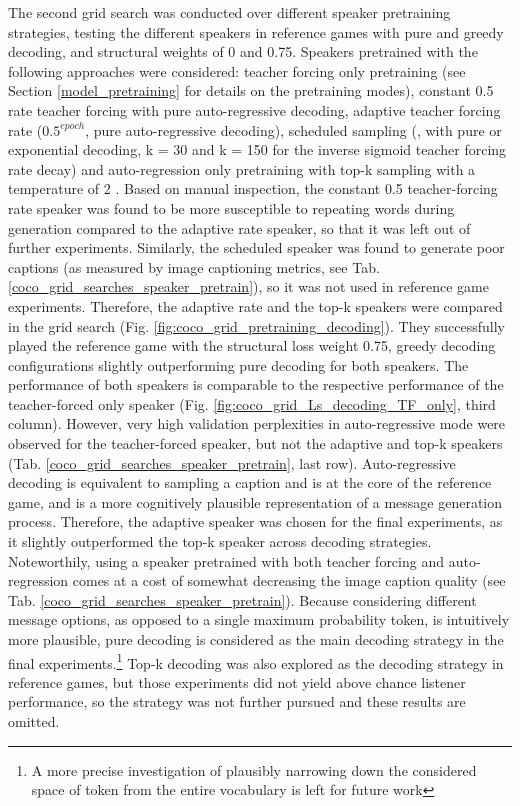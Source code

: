 The second grid search was conducted over different speaker pretraining strategies, testing the different speakers in reference games with pure and greedy decoding, and structural weights of 0 and 0.75. Speakers pretrained with the following approaches were considered: teacher forcing only pretraining (see Section \ref{model_pretraining} for details on the pretraining modes), constant 0.5 rate teacher forcing with pure auto-regressive decoding, adaptive teacher forcing rate ($0.5^{epoch}$, pure auto-regressive decoding), scheduled sampling (\cite{bengio2015scheduled}, with pure or exponential decoding, k = 30 and k = 150 for the inverse sigmoid teacher forcing rate decay) and auto-regression only pretraining with top-k sampling with a temperature of 2 \parencite[following][]{lazaridou2020multi}.
Based on manual inspection, the constant 0.5 teacher-forcing rate speaker was found to be more susceptible to repeating words during generation compared to the adaptive rate speaker, so that it was left out of further experiments. Similarly, the scheduled speaker was found to generate poor captions (as measured by image captioning metrics, see Tab. \ref{coco_grid_searches_speaker_pretrain}), so it was not used in reference game experiments. 
Therefore, the adaptive rate and the top-k speakers were compared in the grid search (Fig. \ref{fig:coco_grid_pretraining_decoding}). 
They successfully played the reference game with the structural loss weight 0.75, greedy decoding configurations slightly outperforming pure decoding for both speakers. The performance of both speakers is comparable to the respective performance of the teacher-forced only speaker (Fig. \ref{fig:coco_grid_Ls_decoding_TF_only}, third column). However, very high validation perplexities in auto-regressive mode were observed for the teacher-forced speaker, but not the adaptive  and top-k speakers (Tab. \ref{coco_grid_searches_speaker_pretrain}, last row). Auto-regressive decoding is equivalent to sampling a caption and is at the core of the reference game, and is a more cognitively plausible representation of a message generation process. Therefore, the adaptive speaker was chosen for the final experiments, as it slightly outperformed the top-k speaker across decoding strategies. Noteworthily, using a speaker pretrained with both teacher forcing and auto-regression comes at a cost of somewhat decreasing the image caption quality (see Tab. \ref{coco_grid_searches_speaker_pretrain}).
Because considering different message options, as opposed to a single maximum probability token, is intuitively more plausible, pure decoding is considered as the main decoding strategy in the final experiments.\footnote{A more precise investigation of plausibly narrowing down the considered space of token from the entire vocabulary is left for future work} Top-k decoding was also explored as the decoding strategy in reference games, but those experiments did not yield above chance listener performance, so the strategy was not further pursued and these results are omitted.

